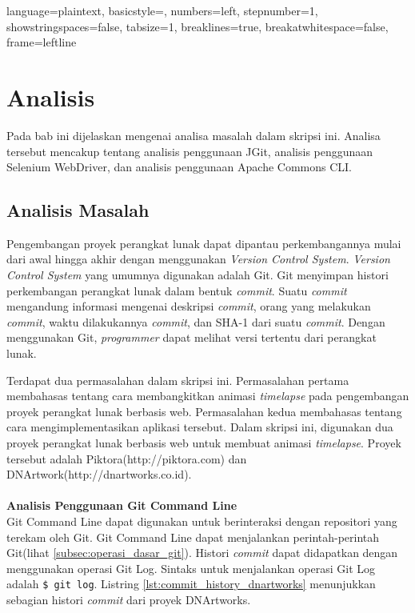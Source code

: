 
\lstset
{ 
    language=plaintext,
    basicstyle=\footnotesize,
    numbers=left,
    stepnumber=1,
    showstringspaces=false,
    tabsize=1,
    breaklines=true,
    breakatwhitespace=false,
    frame=leftline
}

\chapter{Analisis}
\label{chap:analisis}

Pada bab ini dijelaskan mengenai analisa masalah dalam skripsi ini. Analisa tersebut mencakup tentang analisis penggunaan JGit, analisis penggunaan Selenium WebDriver, dan analisis penggunaan Apache Commons CLI. 

\section{Analisis Masalah}
\label{sec:analisis_masalah}
Pengembangan proyek perangkat lunak dapat dipantau perkembangannya mulai dari awal hingga akhir dengan menggunakan \textit{Version Control System}. \textit{Version Control System} yang umumnya digunakan adalah Git. Git menyimpan histori perkembangan perangkat lunak dalam bentuk \textit{commit}. Suatu \textit{commit} mengandung informasi mengenai deskripsi \textit{commit}, orang yang melakukan \textit{commit}, waktu dilakukannya \textit{commit}, dan SHA-1 dari suatu \textit{commit}. Dengan menggunakan Git, \textit{programmer} dapat melihat versi tertentu dari perangkat lunak. 

Terdapat dua permasalahan dalam skripsi ini. Permasalahan pertama membahasas tentang cara membangkitkan animasi \textit{timelapse} pada pengembangan proyek perangkat lunak berbasis web. Permasalahan kedua membahasas tentang cara mengimplementasikan aplikasi tersebut. Dalam skripsi ini, digunakan dua proyek perangkat lunak berbasis web untuk membuat animasi \textit{timelapse}. Proyek tersebut adalah Piktora(http://piktora.com) dan DNArtwork(http://dnartworks.co.id). \\
\\
\textbf{Analisis Penggunaan Git Command Line}\\
Git Command Line dapat digunakan untuk berinteraksi dengan repositori yang terekam oleh Git. Git Command Line dapat menjalankan perintah-perintah Git(lihat \ref{subsec:operasi_dasar_git}). Histori \textit{commit} dapat didapatkan dengan menggunakan operasi Git Log. Sintaks untuk menjalankan operasi Git Log adalah \texttt{\$ git log}. Listring \ref{lst:commit_history_dnartworks} menunjukkan sebagian histori \textit{commit} dari proyek DNArtworks.

